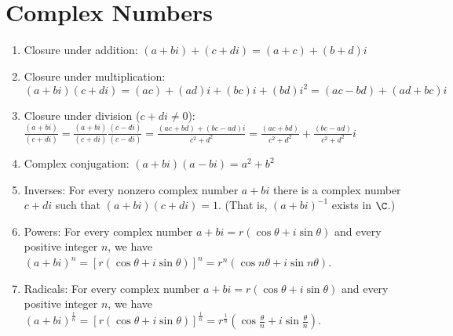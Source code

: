 \section{Complex Numbers}
\begin{theorem}
	\hfill
	\begin{enumerate}
		\item Closure under addition: $(a + bi) + (c + di) = (a + c) + (b + d)i$
		\item Closure under multiplication: $(a + bi)(c + di) = (ac) + (ad)i + (bc)i + (bd)i^2 = (ac - bd) + (ad + bc)i$
		\item Closure under division ($c + di \neq 0$): $\displaystyle\frac{(a + bi)}{(c + di)} = \frac{(a + bi)}{(c + di)}\frac{(c - di)}{(c - di)}=\frac{(ac + bd) + (bc - ad)i}{c^2 + d^2} = \frac{(ac + bd)}{c^2 + d^2} + \frac{(bc - ad)}{c^2 + d^2}i$
		\item Complex conjugation: $(a + bi)(a - bi) = a^2 + b^2$
		\item Inverses: For every nonzero complex number $a + bi$ there is a complex number $c + di$ such that $(a + bi)(c + di)=1$. (That is, $(a + bi)^{-1}$ exists in $\C$.)
		\item Powers: For every complex number $a + bi = r(\cos\theta + i \sin \theta)$ and every positive integer $n$, we have $(a + bi)^n = [r(\cos \theta + i \sin \theta)]^n = r^n(\cos n \theta + i \sin n \theta)$.
		\item Radicals: For every complex number $a + bi = r(\cos \theta + i \sin \theta)$ and every positive integer $n$, we have $\displaystyle(a + bi)^{\frac{1}{n}} = [r(\cos \theta + i \sin \theta)]^{\frac{1}{n}} = r^{\frac{1}{n}}(\cos\frac{\theta}{n} + i \sin \frac{\theta}{n})$.
	\end{enumerate}
\end{theorem}

